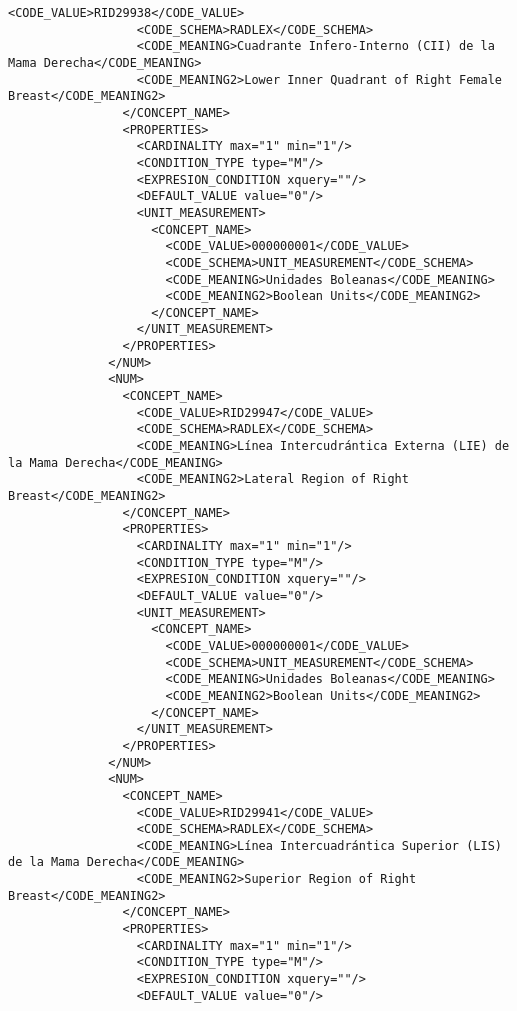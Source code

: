 \begin{lstlisting}[label=some-code,caption=Some Code]
                  <CODE_VALUE>RID29938</CODE_VALUE>
                  <CODE_SCHEMA>RADLEX</CODE_SCHEMA>
                  <CODE_MEANING>Cuadrante Infero-Interno (CII) de la Mama Derecha</CODE_MEANING>
                  <CODE_MEANING2>Lower Inner Quadrant of Right Female Breast</CODE_MEANING2>
                </CONCEPT_NAME>
                <PROPERTIES>
                  <CARDINALITY max="1" min="1"/>
                  <CONDITION_TYPE type="M"/>
                  <EXPRESION_CONDITION xquery=""/>
                  <DEFAULT_VALUE value="0"/>
                  <UNIT_MEASUREMENT>
                    <CONCEPT_NAME>
                      <CODE_VALUE>000000001</CODE_VALUE>
                      <CODE_SCHEMA>UNIT_MEASUREMENT</CODE_SCHEMA>
                      <CODE_MEANING>Unidades Boleanas</CODE_MEANING>
                      <CODE_MEANING2>Boolean Units</CODE_MEANING2>
                    </CONCEPT_NAME>
                  </UNIT_MEASUREMENT>
                </PROPERTIES>
              </NUM>
              <NUM>
                <CONCEPT_NAME>
                  <CODE_VALUE>RID29947</CODE_VALUE>
                  <CODE_SCHEMA>RADLEX</CODE_SCHEMA>
                  <CODE_MEANING>Línea Intercudrántica Externa (LIE) de la Mama Derecha</CODE_MEANING>
                  <CODE_MEANING2>Lateral Region of Right Breast</CODE_MEANING2>
                </CONCEPT_NAME>
                <PROPERTIES>
                  <CARDINALITY max="1" min="1"/>
                  <CONDITION_TYPE type="M"/>
                  <EXPRESION_CONDITION xquery=""/>
                  <DEFAULT_VALUE value="0"/>
                  <UNIT_MEASUREMENT>
                    <CONCEPT_NAME>
                      <CODE_VALUE>000000001</CODE_VALUE>
                      <CODE_SCHEMA>UNIT_MEASUREMENT</CODE_SCHEMA>
                      <CODE_MEANING>Unidades Boleanas</CODE_MEANING>
                      <CODE_MEANING2>Boolean Units</CODE_MEANING2>
                    </CONCEPT_NAME>
                  </UNIT_MEASUREMENT>
                </PROPERTIES>
              </NUM>
              <NUM>
                <CONCEPT_NAME>
                  <CODE_VALUE>RID29941</CODE_VALUE>
                  <CODE_SCHEMA>RADLEX</CODE_SCHEMA>
                  <CODE_MEANING>Línea Intercuadrántica Superior (LIS) de la Mama Derecha</CODE_MEANING>
                  <CODE_MEANING2>Superior Region of Right Breast</CODE_MEANING2>
                </CONCEPT_NAME>
                <PROPERTIES>
                  <CARDINALITY max="1" min="1"/>
                  <CONDITION_TYPE type="M"/>
                  <EXPRESION_CONDITION xquery=""/>
                  <DEFAULT_VALUE value="0"/>

\end{lstlisting}
